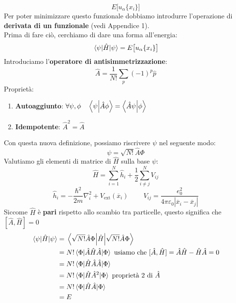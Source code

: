\begin{equation*}
    E\big[u_\alpha\{x_i\}\big]
\end{equation*}
Per poter minimizzare questo funzionale dobbiamo introdurre l'operazione di \textbf{derivata di un funzionale} (vedi Appendice 1).\\
Prima di fare ciò, cerchiamo di dare una forma all'energia:
\begin{equation*}
    \mel{\psi}{\hat H}{\psi}=E\big[u_\alpha\{x_i\}\big]
\end{equation*}
Introduciamo l'\textbf{operatore di antisimmetrizzazione}:
\begin{equation*}
    \hat A = \frac{1}{N!}\sum_p(-1)^p\hat p
\end{equation*}
\noindent Proprietà:
\begin{enumerate}
    \item \textbf{Autoaggiunto}: $\forall\psi,\phi \ \ \ \ip{\psi}{\hat A \phi}=\ip{\hat A \psi}{\phi}$
    \item \textbf{Idempotente}: $\hat A ^2 = \hat A$
\end{enumerate}
Con questa nuova definizione, possiamo riscrivere $\psi$ nel seguente modo:
\begin{equation*}
    \psi = \sqrt{N!}\hat A \Phi
\end{equation*}
Valutiamo gli elementi di matrice di $\hat H$ sulla base $\psi$:
\begin{equation*}
    \hat H = \sum_{i=1}^N \hat h_i + \frac 12 \sum_{i\neq j}^NV_{ij} 
\end{equation*}
\begin{equation*}
    \hat h_i = -\frac{\hbar^2}{2m}\nabla_i^2+V_{\text{ext}}(\overline{x}_i) \ \ \ \ \ \ \ \ \ \ V_{ij}=\frac{e_0^2}{4\pi\varepsilon_0|\overline{x}_i-\overline{x}_j|}
\end{equation*}
Siccome $\hat H$ è \textbf{pari} rispetto allo scambio tra particelle, questo significa che $[\hat A, \hat H]=0$
\begin{equation*}
    \begin{aligned}
        \mel{\psi}{\hat H}{\psi}
        & =\mel{{\sqrt{N!}\hat A \Phi}}{\hat H}{{\sqrt{N!}\hat A \Phi}} \\
        & =N!\mel{\Phi}{\hat A \hat H \hat A}{\Phi} \text{ usiamo che }[\hat A, \hat H]=\hat A\hat H - \hat H \hat A = 0\\
        & =N!\mel{\Phi}{\hat H \hat A \hat A}{\Phi} \\
        & =N!\mel{\Phi}{\hat H \hat A^2}{\Phi} \text{ proprietà 2 di }\hat A\\
        & =N!\mel{\Phi}{\hat H\hat A}{\Phi} \\
        & = E
    \end{aligned}
\end{equation*}
